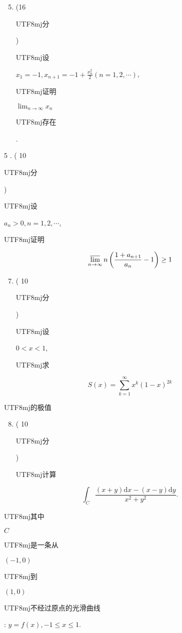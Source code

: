 \documentclass[10pt]{article}
\begin{document}
\begin{enumerate}
  \setcounter{enumi}{4}
  \item (16 \begin{CJK}{UTF8}{mj}分\end{CJK}) \begin{CJK}{UTF8}{mj}设\end{CJK} $x_{1}=-1, x_{n+1}=-1+\frac{x_{n}^{2}}{2}(n=1,2, \cdots)$, \begin{CJK}{UTF8}{mj}证明\end{CJK} $\lim _{n \rightarrow \infty} x_{n}$ \begin{CJK}{UTF8}{mj}存在\end{CJK}.
\end{enumerate}
5 . ( 10 \begin{CJK}{UTF8}{mj}分\end{CJK}) \begin{CJK}{UTF8}{mj}设\end{CJK} $a_{n}>0, n=1,2, \cdots$, \begin{CJK}{UTF8}{mj}证明\end{CJK}
$$
\varlimsup_{n \rightarrow \infty} n\left(\frac{1+a_{n+1}}{a_{n}}-1\right) \geq 1
$$

\begin{enumerate}
  \setcounter{enumi}{6}
  \item ( 10 \begin{CJK}{UTF8}{mj}分\end{CJK}) \begin{CJK}{UTF8}{mj}设\end{CJK} $0<x<1$, \begin{CJK}{UTF8}{mj}求\end{CJK}
\end{enumerate}
$$
S(x)=\sum_{k=1}^{\infty} x^{k}(1-x)^{2 k}
$$
\begin{CJK}{UTF8}{mj}的极值\end{CJK}

\begin{enumerate}
  \setcounter{enumi}{7}
  \item ( 10 \begin{CJK}{UTF8}{mj}分\end{CJK}) \begin{CJK}{UTF8}{mj}计算\end{CJK}
\end{enumerate}
$$
\int_{C} \frac{(x+y) \mathrm{d} x-(x-y) \mathrm{d} y}{x^{2}+y^{2}} .
$$
\begin{CJK}{UTF8}{mj}其中\end{CJK} $C$ \begin{CJK}{UTF8}{mj}是一条从\end{CJK} $(-1,0)$ \begin{CJK}{UTF8}{mj}到\end{CJK} $(1,0)$ \begin{CJK}{UTF8}{mj}不经过原点的光滑曲线\end{CJK}: $y=f(x),-1 \leq x \leq 1$.
\end{document}
